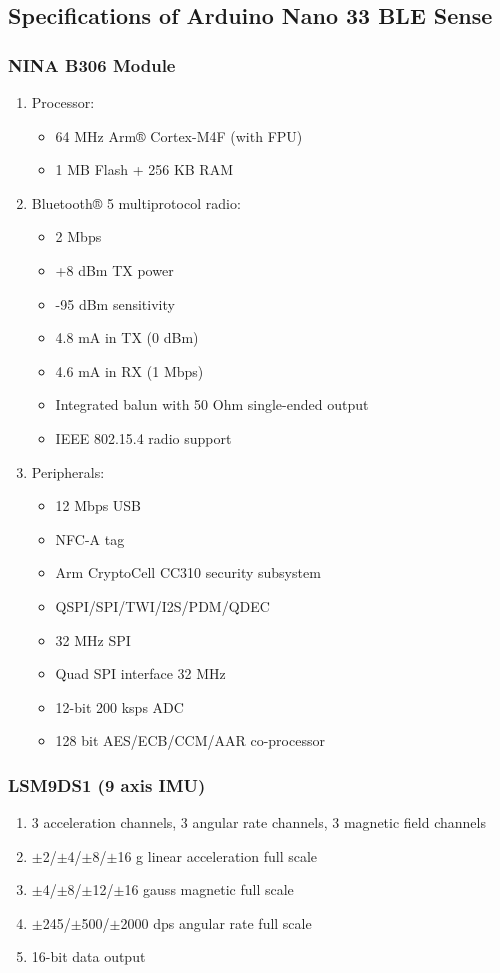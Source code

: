 \subsection{Specifications of Arduino Nano 33 BLE Sense}


\subsubsection*{NINA B306 Module}
\begin{enumerate}[label=\arabic*.]
	\item Processor:
	\begin{itemize}[label=-]
		\item 64 MHz Arm® Cortex-M4F (with FPU)
		\item 1 MB Flash + 256 KB RAM
	\end{itemize}
	\item Bluetooth® 5 multiprotocol radio:
	\begin{itemize}[label=-]
		\item 2 Mbps
		\item +8 dBm TX power
		\item -95 dBm sensitivity
		\item 4.8 mA in TX (0 dBm)
		\item 4.6 mA in RX (1 Mbps)
		\item Integrated balun with 50 Ohm single-ended output
		\item IEEE 802.15.4 radio support
	\end{itemize}
	\item Peripherals:
	\begin{itemize}[label=-]
		\item 12 Mbps USB
		\item NFC-A tag
		\item Arm CryptoCell CC310 security subsystem
		\item QSPI/SPI/TWI/I2S/PDM/QDEC
		\item 32 MHz SPI
		\item Quad SPI interface 32 MHz
		\item 12-bit 200 ksps ADC
		\item 128 bit AES/ECB/CCM/AAR co-processor
	\end{itemize}
\end{enumerate}

\subsubsection*{LSM9DS1 (9 axis IMU)}\cite{Warden:2020}
\begin{enumerate}[label=\arabic*.]
	\item 3 acceleration channels, 3 angular rate channels, 3 magnetic field channels
	\item $\pm$2/$\pm$4/$\pm$8/$\pm$16 g linear acceleration full scale
	\item $\pm$4/$\pm$8/$\pm$12/$\pm$16 gauss magnetic full scale
	\item $\pm$245/$\pm$500/$\pm$2000 dps angular rate full scale
	\item 16-bit data output
\end{enumerate}




